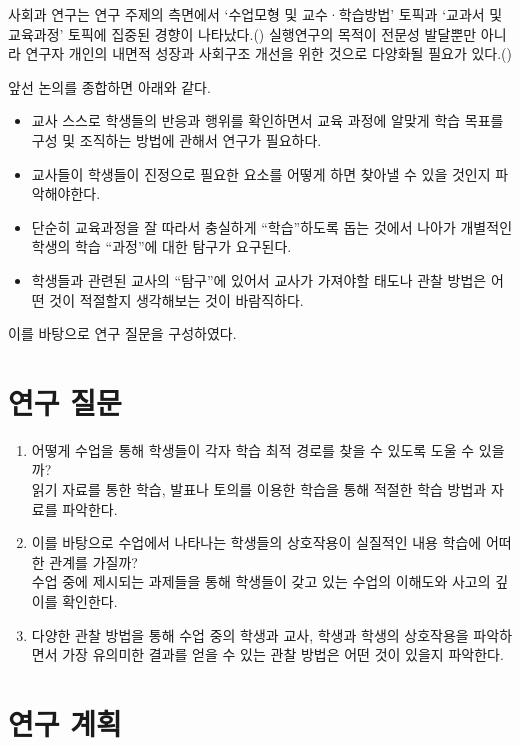 \documentclass[10pt, a4paper]{oblivoir}
\begin{document}
    사회과 연구는 연구 주제의 측면에서 `수업모형 및 교수·학습방법’ 토픽과 `교과서 및 교육과정’ 토픽에
     집중된 경향이 나타났다.(\cite{김재우2019텍스트}) 실행연구의 목적이 전문성 발달뿐만 아니라 연구자 개인의 
    내면적 성장과 사회구조 개선을 위한 것으로 다양화될 필요가 있다.(\cite{강지영2011국내}) \newline

    앞선 논의를 종합하면 아래와 같다. 
    \begin{itemize}[$\ast$]
        \item 교사 스스로 학생들의 반응과 행위를 확인하면서 교육 과정에 알맞게 학습 목표를 구성 및 조직하는 방법에 관해서 연구가 필요하다.
        \item 교사들이 학생들이 진정으로 필요한 요소를 어떻게 하면 찾아낼 수 있을 것인지 파악해야한다. 
        \item 단순히 교육과정을 잘 따라서 충실하게 ``학습''하도록 돕는 것에서 나아가 개별적인 학생의 학습 ``과정''에 대한 탐구가 요구된다. 
        \item 학생들과 관련된 교사의 ``탐구''에 있어서 교사가 가져야할 태도나 관찰 방법은 어떤 것이 적절할지 생각해보는 것이 바람직하다. 
    \end{itemize}

    이를 바탕으로 연구 질문을 구성하였다. 
    

    \section{연구 질문}
    \begin{enumerate}
        \item 어떻게 수업을 통해 학생들이 각자 학습 최적 경로를 찾을 수 있도록 도울 수 있을까?  \\ 읽기 자료를 통한 학습, 발표나 토의를 이용한 학습을 통해 적절한 학습 방법과 자료를 파악한다. 
        \item  이를 바탕으로 수업에서 나타나는 학생들의 상호작용이 실질적인 내용 학습에 어떠한 관계를 가질까? \\  수업 중에 제시되는 과제들을 통해 학생들이 갖고 있는 수업의 이해도와 사고의 깊이를 확인한다. 
        \item 다양한 관찰 방법을 통해 수업 중의 학생과 교사, 학생과 학생의 상호작용을 파악하면서 가장 유의미한 결과를 얻을 수 있는 관찰 방법은 어떤 것이 있을지 파악한다. 
    \end{enumerate}

    \section{연구 계획}
\end{document}

